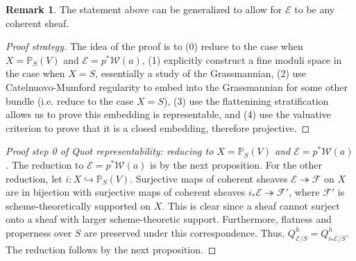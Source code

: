 \documentclass[10pt]{article}
\theoremstyle{definition}
\newtheorem{rmk}[thm]{Remark}
\newcommand{\PP}{\mathbb{P}}
\begin{document}
\begin{rmk}
The statement above can be generalized to allow for $\mathcal{E}$ to be any coherent sheaf.
\end{rmk}

\begin{proof}[Proof strategy]
The idea of the proof is to (0) reduce to the case when $X = \PP_S(V)$ and $\mathcal{E} = p^*\mathcal{W}(a)$, (1) explicitly construct a fine moduli space in the case when $X = S$, essentially a study of the Grassmannian, (2) use Catelnuovo-Mumford regularity to embed into the Grassmannian for some other bundle (i.e. reduce to the case $X = S$), (3) use the flattenining stratification allows us to prove this embedding is representable, and (4) use the valuative criterion to prove that it is a closed embedding, therefore projective.
\end{proof}


\begin{proof}[Proof step 0 of Quot representability: reducing to $X = \PP_S(V)$ and $\mathcal{E} = p^* \mathcal{W}(a)$]
The reduction to $\mathcal{E} = p^* \mathcal{W}(a)$ is by the next proposition.  For the other reduction, let $i: X \hookrightarrow \PP_S(V)$.  Surjective maps of coherent sheaves $\mathcal{E} \twoheadrightarrow \mathcal{F}$ on $X$ are in bijection with surjective maps of coherent sheaves $i_* \mathcal{E} \twoheadrightarrow \mathcal{F}'$, where $\mathcal{F}'$ is scheme-theoretically supported on $X$.  This is clear since a sheaf cannot surject onto a sheaf with larger scheme-theoretic support.  Furthermore, flatness and properness over $S$ are preserved under this correspondence.  Thus, $Q^h_{\mathcal{E}/S} = Q^h_{i_*\mathcal{E}/S}$.  The reduction follows by the next proposition.
\end{proof}
\end{document}
